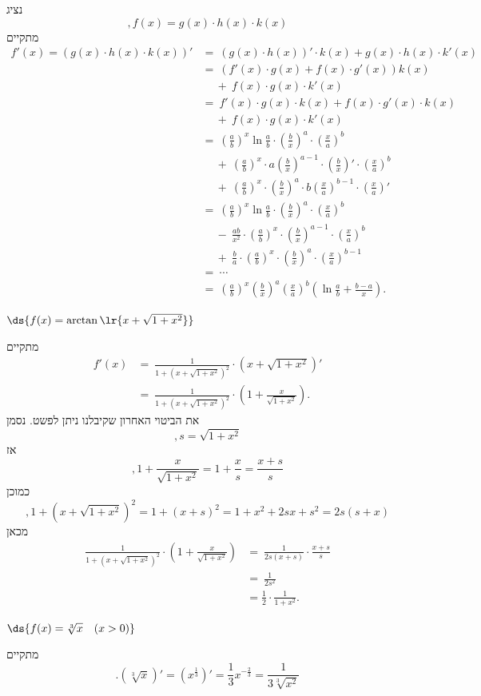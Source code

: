 \begin{solbox}
נציג
$$,f(x)=g(x)\cdot h(x)\cdot k(x)$$
מתקיים
\begin{align*}
    f'(x)=\left(g(x)\cdot h(x)\cdot k(x)\right)'
    &=\ \left(g(x)\cdot h(x)\right)'\cdot k(x)+g(x)\cdot h(x)\cdot k'(x)\\
    &=\ \left(f'(x)\cdot g(x)+f(x)\cdot g'(x)\right)k(x)\\
    &\quad\ +\ f(x)\cdot g(x)\cdot k'(x)\\
    &=\ f'(x)\cdot g(x)\cdot k(x)+f(x)\cdot g'(x)\cdot k(x)\\
    &\quad\ +\ f(x)\cdot g(x)\cdot k'(x)\\
    &=\ \left(\frac{a}{b}\right)^x\ln\frac{a}{b}\cdot\left(\frac{b}{x}\right)^a\cdot\left(\frac{x}{a}\right)^b\\
    &\quad\ +\ \left(\frac{a}{b}\right)^x\cdot a\left(\frac{b}{x}\right)^{a-1}\cdot\left(\frac{b}{x}\right)'\cdot\left(\frac{x}{a}\right)^b\\
    &\quad\ +\ \left(\frac{a}{b}\right)^x\cdot \left(\frac{b}{x}\right)^{a}\cdot b\left(\frac{x}{a}\right)^{b-1}\cdot\left(\frac{x}{a}\right)'\\
    &=\ \left(\frac{a}{b}\right)^x\ln\frac{a}{b}\cdot\left(\frac{b}{x}\right)^a\cdot\left(\frac{x}{a}\right)^b\\
    &\quad\ -\ \frac{ab}{x^2}\cdot\left(\frac{a}{b}\right)^x\cdot\left(\frac{b}{x}\right)^{a-1}\cdot\left(\frac{x}{a}\right)^b\\
    &\quad\ +\ \frac{b}{a}\cdot\left(\frac{a}{b}\right)^x\cdot \left(\frac{b}{x}\right)^{a}\cdot\left(\frac{x}{a}\right)^{b-1}\\
    &=\ \cdots\\
    &=\ \left(\frac{a}{b}\right)^x\left(\frac{b}{x}\right)^a\left(\frac{x}{a}\right)^b
\left(\ln\frac{a}{b}+\frac{b-a}{x}\right).
\end{align*}
\end{solbox}
\item $\ds{f(x) = \arctan\lr{x + \sqrt{1 + x^2}}}$
\begin{solbox}
מתקיים
\begin{align*}
    f'(x)&=\ \frac{1}{1+(x+\sqrt{1+x^2})^2}\cdot\left(x+\sqrt{1+x^2}\right)'\\
    &=\ \frac{1}{1+(x+\sqrt{1+x^2})^2}\cdot\left(1+\frac{x}{\sqrt{1+x^2}}\right).
\end{align*}
את הביטוי האחרון שקיבלנו ניתן לפשט.
נסמן
$$,s=\sqrt{1+x^2}$$
אז
$$,1+\frac{x}{\sqrt{1+x^2}}=1+\frac{x}{s}=\frac{x+s}{s}$$
כמוכן
$$,1+\left(x+\sqrt{1+x^2}\right)^2=1+(x+s)^2=1+x^2+2sx+s^2=2s(s+x)$$
מכאן
\begin{align*}
\frac{1}{1+(x+\sqrt{1+x^2})^2}\cdot\left(1+\frac{x}{\sqrt{1+x^2}}\right)&=\ \frac{1}{2s(x+s)}\cdot\frac{x+s}{s}\\
&=\ \frac{1}{2s^2}\\
&=\frac{1}{2}\cdot\frac{1}{1+x^2}.
\end{align*}
\end{solbox}
\item $\ds{f(x) = \sqrt[3]{x} \quad (x > 0)}$
\begin{solbox}
מתקיים
$$.\left(\sqrt[3]{x}\right)'=\left(x^{\frac{1}{3}}\right)'=\frac{1}{3}x^{-\frac{2}{3}}=\frac{1}{3\sqrt[3]{x^2}}$$
\end{solbox}
\eMs
\eE
